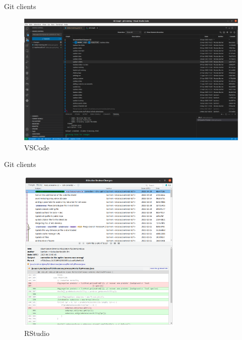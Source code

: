 \documentclass[10pt]{beamer}
\begin{document}
\begin{frame}{Git clients}
\protect\hypertarget{git-clients-1}{}
\begin{figure}

{\centering \includegraphics[width=\textwidth]{img/vscode.png}

}

\caption{\label{fig-vscode}VSCode}

\end{figure}
\end{frame}

\begin{frame}{Git clients}
\protect\hypertarget{git-clients-2}{}
\begin{figure}

{\centering \includegraphics[width=0.7\textwidth]{img/rstudio.png}

}

\caption{\label{fig-rstudio}RStudio}

\end{figure}
\end{frame}
\end{document}
